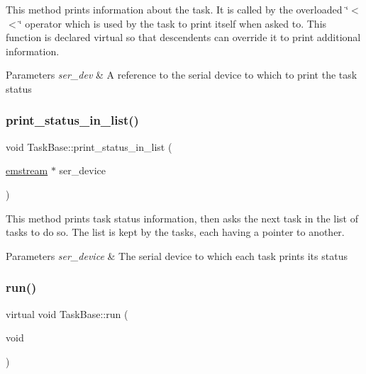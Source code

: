 This method prints information about the task. It is called by the overloaded \char`\"{}$<$$<$\char`\"{} operator which is used by the task to print itself when asked to. This function is declared virtual so that descendents can override it to print additional information. 
\begin{DoxyParams}{Parameters}
{\em ser\+\_\+dev} & A reference to the serial device to which to print the task status \\
\hline
\end{DoxyParams}
\mbox{\label{class_task_base_a58bd479a964b4c98da9f8f1a6b08efd7}} 
\subsubsection{\texorpdfstring{print\+\_\+status\+\_\+in\+\_\+list()}{print\_status\_in\_list()}}
{\footnotesize\ttfamily void Task\+Base\+::print\+\_\+status\+\_\+in\+\_\+list (\begin{DoxyParamCaption}\item[{\mbox{\hyperlink{classemstream}{emstream}} $\ast$}]{ser\+\_\+device }\end{DoxyParamCaption})}

This method prints task status information, then asks the next task in the list of tasks to do so. The list is kept by the tasks, each having a pointer to another. 
\begin{DoxyParams}{Parameters}
{\em ser\+\_\+device} & The serial device to which each task prints its status \\
\hline
\end{DoxyParams}
\mbox{\label{class_task_base_adcf6036ad9c860051ccf392ba5e7dbbc}} 
\subsubsection{\texorpdfstring{run()}{run()}}
{\footnotesize\ttfamily virtual void Task\+Base\+::run (\begin{DoxyParamCaption}\item[{void}]{ }\end{DoxyParamCaption})\hspace{0.3cm}{\ttfamily [pure virtual]}}



